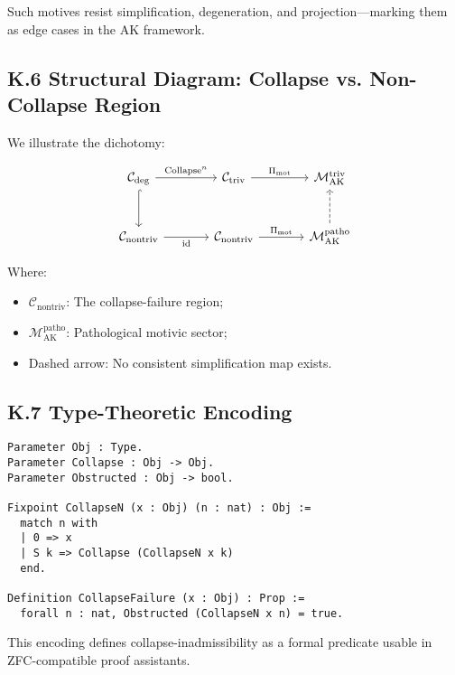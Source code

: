 \documentclass[11pt]{article}
\begin{document}
Such motives resist simplification, degeneration, and projection—marking them as edge cases in the AK framework.

\subsection*{K.6 Structural Diagram: Collapse vs. Non-Collapse Region}

We illustrate the dichotomy:

\[
\begin{tikzcd}[column sep=large, row sep=large]
\mathcal{C}_{\mathrm{deg}} \arrow[r, "\mathrm{Collapse}^n"] \arrow[d, hook]
& \mathcal{C}_{\mathrm{triv}} \arrow[r, "\Pi_{\mathrm{mot}}"]
& \mathcal{M}_{\mathrm{AK}}^{\mathrm{triv}} \\
\mathcal{C}_{\mathrm{nontriv}} \arrow[r, "\mathrm{id}"']
& \mathcal{C}_{\mathrm{nontriv}} \arrow[r, "\Pi_{\mathrm{mot}}"]
& \mathcal{M}_{\mathrm{AK}}^{\mathrm{patho}} \arrow[u, dashrightarrow]
\end{tikzcd}
\]

Where:

\begin{itemize}
    \item $\mathcal{C}_{\mathrm{nontriv}}$: The collapse-failure region;
    \item $\mathcal{M}_{\mathrm{AK}}^{\mathrm{patho}}$: Pathological motivic sector;
    \item Dashed arrow: No consistent simplification map exists.
\end{itemize}

\subsection*{K.7 Type-Theoretic Encoding}

\begin{lstlisting}[language=Coq, caption=Collapse Failure Encoding]
Parameter Obj : Type.
Parameter Collapse : Obj -> Obj.
Parameter Obstructed : Obj -> bool.

Fixpoint CollapseN (x : Obj) (n : nat) : Obj :=
  match n with
  | 0 => x
  | S k => Collapse (CollapseN x k)
  end.

Definition CollapseFailure (x : Obj) : Prop :=
  forall n : nat, Obstructed (CollapseN x n) = true.
\end{lstlisting}

This encoding defines collapse-inadmissibility as a formal predicate usable in ZFC-compatible proof assistants.
\end{document}

